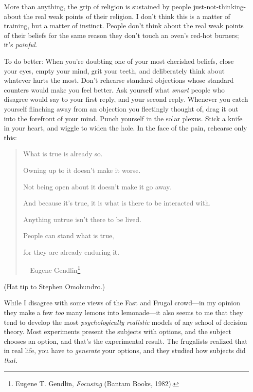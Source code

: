 {
 More than anything, the grip of religion is sustained by people
just-not-thinking-about the real weak points of their religion. I
don't think this is a matter of training, but a matter
of instinct. People don't think about the real weak
points of their beliefs for the same reason they don't
touch an oven's red-hot burners; it's
\textit{painful.}}

{
 To do better: When you're doubting one of your
most cherished beliefs, close your eyes, empty your mind, grit your
teeth, and deliberately think about whatever hurts the most.
Don't rehearse standard objections whose standard
counters would make you feel better. Ask yourself what \textit{smart}
people who disagree would say to your first reply, and your second
reply. Whenever you catch yourself flinching away from an objection you
fleetingly thought of, drag it out into the forefront of your mind.
Punch yourself in the solar plexus. Stick a knife in your heart, and
wiggle to widen the hole. In the face of the pain, rehearse only this:}

\begin{quote}
{
 What is true is already so.}

{
 Owning up to it doesn't make it worse.}

{
 Not being open about it doesn't make it go away.}

{
 And because it's true, it is what is there to be
interacted with.}

{
 Anything untrue isn't there to be lived.}

{
 People can stand what is true,}

{
 for they are already enduring it.}

{\raggedleft
 {}---Eugene Gendlin\footnote{Eugene T. Gendlin, \textit{Focusing} (Bantam Books, 1982).}
 \par}
\end{quote}


{
 (Hat tip to Stephen Omohundro.)}

\myendsectiontext


\bigskip


{
 While I disagree with some views of the Fast and Frugal crowd---in
my opinion they make a few \textit{too} many lemons into lemonade---it
also seems to me that they tend to develop the most
\textit{psychologically realistic} models of any school of decision
theory. Most experiments present the subjects with options, and the
subject chooses an option, and that's the experimental
result. The frugalists realized that in real life, you have to
\textit{generate} your options, and they studied how subjects did
\textit{that.} }

